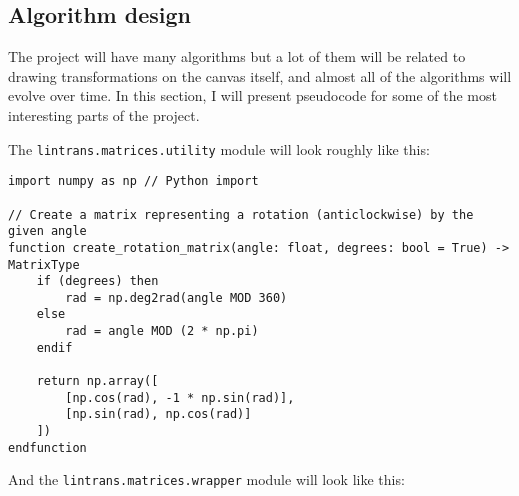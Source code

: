 \documentclass[../main.tex]{subfiles}
\begin{document}
\subsection{Algorithm design\label{design:algorithm-design}}

The project will have many algorithms but a lot of them will be related to drawing transformations on the canvas itself, and almost all of the algorithms will evolve over time. In this section, I will present pseudocode for some of the most interesting parts of the project.

The \texttt{lintrans.matrices.utility} module will look roughly like this:

\begin{verbatim}
import numpy as np // Python import

// Create a matrix representing a rotation (anticlockwise) by the given angle
function create_rotation_matrix(angle: float, degrees: bool = True) -> MatrixType
	if (degrees) then
		rad = np.deg2rad(angle MOD 360)
	else
		rad = angle MOD (2 * np.pi)
	endif

	return np.array([
		[np.cos(rad), -1 * np.sin(rad)],
		[np.sin(rad), np.cos(rad)]
	])
endfunction
\end{verbatim}

And the \texttt{lintrans.matrices.wrapper} module will look like this:
\end{document}
